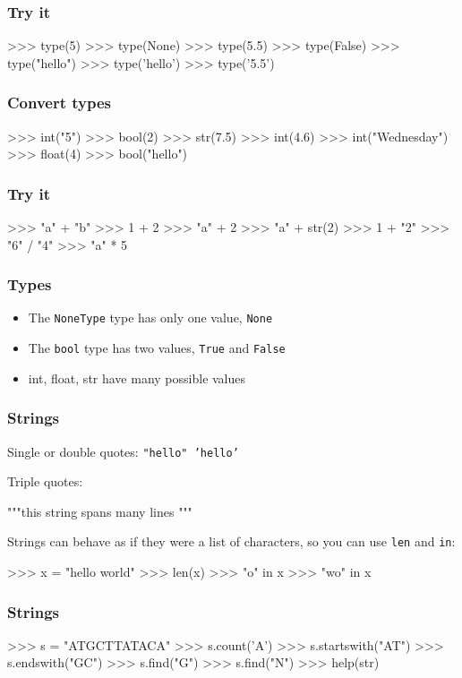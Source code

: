 \documentclass{beamer}
\begin{document}
\begin{frame}[fragile]
\frametitle{Try it}
\begin{code}
>>> type(5)
>>> type(None)
>>> type(5.5)
>>> type(False)
>>> type("hello")
>>> type('hello')
>>> type('5.5')
\end{code}
\end{frame}

\begin{frame}[fragile]
\frametitle{Convert types}
\begin{code}
>>> int("5")
>>> bool(2)
>>> str(7.5)
>>> int(4.6)
>>> int("Wednesday")
>>> float(4)
>>> bool("hello")
\end{code}
\end{frame}


\begin{frame}[fragile]
\frametitle{Try it}
\begin{code}
>>> "a" + "b"
>>> 1 + 2
>>> "a" + 2
>>> "a" + str(2)
>>> 1 + "2"
>>> "6" / "4"
>>> "a" * 5
\end{code}
\end{frame}

\begin{frame}
\frametitle{Types}
\begin{itemize}
\item The {\tt NoneType} type has only one value, {\tt None}
\item The {\tt bool} type has two values, {\tt True} and {\tt False}
\item int, float, str have many possible values
\end{itemize}
\end{frame}

\begin{frame}[fragile]
\frametitle{Strings}
Single or double quotes: {\tt "hello" 'hello'}

Triple quotes:
\begin{code}
"""this string
spans many
lines
"""
\end{code}

Strings can behave as if they were a list of characters, so
you can use {\tt len} and {\tt in}: 
\begin{code}
>>> x = "hello world"
>>> len(x)
>>> "o" in x
>>> "wo" in x
\end{code}
\end{frame}


\begin{frame}[fragile]
\frametitle{Strings}
\begin{code}
>>> s = "ATGCTTATACA"
>>> s.count('A')
>>> s.startswith("AT")
>>> s.endswith("GC")
>>> s.find("G")
>>> s.find("N")
>>> help(str)
\end{code}
\end{frame}
\end{document}
